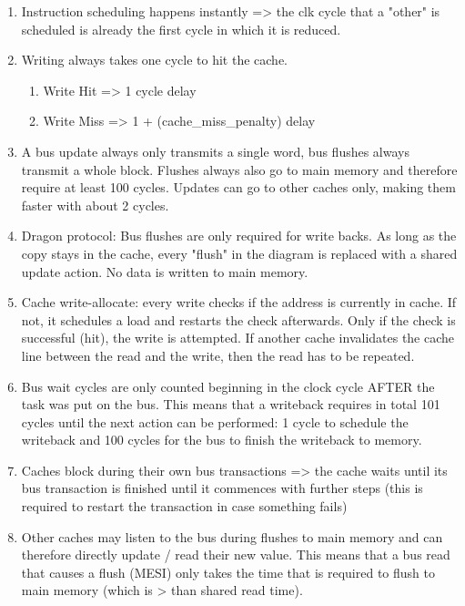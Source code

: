 \begin{enumerate}
    \item Instruction scheduling happens instantly => the clk cycle that a "other" is scheduled is
          already the first cycle in which it is reduced.
    \item Writing always takes one cycle to hit the cache.
          \begin{enumerate}
              \item Write Hit => 1 cycle delay
              \item Write Miss => 1 + (cache\_miss\_penalty) delay
          \end{enumerate}
    \item A bus update always only transmits a single word, bus flushes always transmit a whole block.
          Flushes always also go to main memory and therefore require at least 100 cycles. Updates can go to
          other caches only, making them faster with about 2 cycles.
    \item Dragon protocol: Bus flushes are only required for write backs. As long as the copy stays in
          the cache, every "flush" in the diagram is replaced with a shared update action. No data is written
          to main memory.
    \item Cache write-allocate: every write checks if the address is currently in cache. If not, it
          schedules a load and restarts the check afterwards. Only if the check is successful (hit), the write
          is attempted. If another cache invalidates the cache line between the read and the write, then the
          read has to be repeated.
    \item Bus wait cycles are only counted beginning in the clock cycle AFTER the task was put on the
          bus. This means that a writeback requires in total 101 cycles until the next action can be
          performed: 1 cycle to schedule the writeback and 100 cycles for the bus to finish the writeback to
          memory.
    \item Caches block during their own bus transactions => the cache waits until its bus transaction is
          finished until it commences with further steps (this is required to restart the transaction in case
          something fails)
    \item Other caches may listen to the bus during flushes to main memory and can therefore directly
          update / read their new value. This means that a bus read that causes a flush (MESI) only takes the
          time that is required to flush to main memory (which is > than shared read time).

\end{enumerate}
